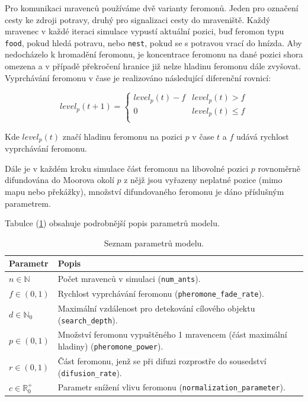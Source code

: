 \documentclass[10pt,a4paper,twocolumn]{article}
\begin{document}
Pro komunikaci mravenců používáme dvě varianty feromonů. Jeden pro označení 
cesty ke zdroji potravy, druhý pro signalizaci cesty do mraveniště. 
Každý mravenec v každé iteraci simulace vypustí aktuální pozici, buď feromon typu
\texttt{food}, pokud hledá potravu, nebo \texttt{nest}, pokud se s potravou
vrací do hnízda. Aby nedocházelo k hromadění feromonu, je koncentrace feromonu
na dané pozici shora omezena a v případě překročení hranice již nelze hladinu
feromonu dále zvyšovat. Vyprchávání feromonu v čase je realizováno následující 
diferenční rovnicí:

\begin{equation}
  level_{p}(t+1) = 
  \left\{
    \begin{array}{ll}
      level_{p}(t) - f  & level_{p}(t) > f \\
      0 & level_{p}(t) \leq f \\ 
    \end{array}
  \right.
\end{equation}

Kde $level_{p}(t)$ značí hladinu feromonu na pozici $p$ v čase $t$ a $f$
udává rychlost vyprchávání feromonu.

Dále je v každém kroku simulace část feromonu na libovolné pozici $p$ 
rovnoměrně difundována do Moorova okolí $p$ z nějž jsou vyřazeny neplatné pozice
(mimo mapu nebo překážky), množství difundovaného feromonu je dáno 
příslušným parametrem.

Tabulce (\ref{table:parametry}) obsahuje podrobnější popis parametrů modelu.


\begin{table}[t]
  \centering %
  \begin{tabular}{l p{5cm}}
  \toprule
  Parametr & Popis \\
  \midrule
    $n \in \mathbb{N}$ & Počet mravenců v simulaci 
    (\texttt{num\_ants}). \\ 
    $f \in (0, 1)$ & Rychlost vyprchávání feromonu 
    (\texttt{pheromone\_fade\_rate}). \\
    $d \in \mathbb{N}_0$ & Maximální vzdálenost pro detekování 
    cílového objektu (\texttt{search\_depth}).\\
    $p \in (0, 1)$ & Množství feromonu vypuštěného 1 mravencem 
    (část maximální hladiny) (\texttt{pheromone\_power}).\\
    $r \in (0, 1)$ & Část feromonu, jenž se při difuzi rozprostře do 
    sousedství (\texttt{difusion\_rate}). \\
    $c \in \mathbb{R}_0^{+}$ & Parametr snížení vlivu feromonu
    (\texttt{normalization\_parameter}).\\ 
  \bottomrule
  \end{tabular}
  \caption{Seznam parametrů modelu.} \label{table:parametry} 
\end{table}
\end{document}
